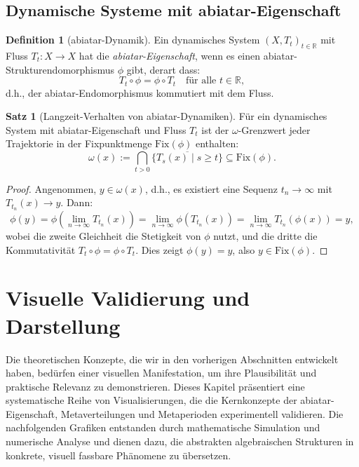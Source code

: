 \documentclass[a4paper,12pt]{article}
\theoremstyle{definition}
\newtheorem{definition}{Definition}
\newtheorem{satz}{Satz}
\begin{document}
\subsection{Dynamische Systeme mit abiatar-Eigenschaft}

\begin{definition}[abiatar-Dynamik]
Ein dynamisches System $(X, T_t)_{t \in \mathbb{R}}$ mit Fluss $T_t: X \to X$ hat die \textit{abiatar-Eigenschaft}, wenn es einen abiatar-Strukturendomorphismus $\phi$ gibt, derart dass:
\[
T_t \circ \phi = \phi \circ T_t \quad \text{für alle } t \in \mathbb{R},
\]
d.h., der abiatar-Endomorphismus kommutiert mit dem Fluss.
\end{definition}

\begin{satz}[Langzeit-Verhalten von abiatar-Dynamiken]
\label{satz:longterm}
Für ein dynamisches System mit abiatar-Eigenschaft und Fluss $T_t$ ist der $\omega$-Grenzwert jeder Trajektorie in der Fixpunktmenge $\text{Fix}(\phi)$ enthalten:
\[
\omega(x) := \bigcap_{t > 0} \overline{\{T_s(x) \mid s \geq t\}} \subseteq \text{Fix}(\phi).
\]
\end{satz}

\begin{proof}
Angenommen, $y \in \omega(x)$, d.h., es existiert eine Sequenz $t_n \to \infty$ mit $T_{t_n}(x) \to y$. Dann:
\[
\phi(y) = \phi(\lim_{n \to \infty} T_{t_n}(x)) = \lim_{n \to \infty} \phi(T_{t_n}(x)) = \lim_{n \to \infty} T_{t_n}(\phi(x)) = y,
\]
wobei die zweite Gleichheit die Stetigkeit von $\phi$ nutzt, und die dritte die Kommutativität $T_t \circ \phi = \phi \circ T_t$. Dies zeigt $\phi(y) = y$, also $y \in \text{Fix}(\phi)$. 
\end{proof}


\section{Visuelle Validierung und Darstellung}

Die theoretischen Konzepte, die wir in den vorherigen Abschnitten entwickelt haben, bedürfen einer visuellen Manifestation, um ihre Plausibilität und praktische Relevanz zu demonstrieren. Dieses Kapitel präsentiert eine systematische Reihe von Visualisierungen, die die Kernkonzepte der abiatar-Eigenschaft, Metaverteilungen und Metaperioden experimentell validieren. Die nachfolgenden Grafiken entstanden durch mathematische Simulation und numerische Analyse und dienen dazu, die abstrakten algebraischen Strukturen in konkrete, visuell fassbare Phänomene zu übersetzen.
\end{document}

